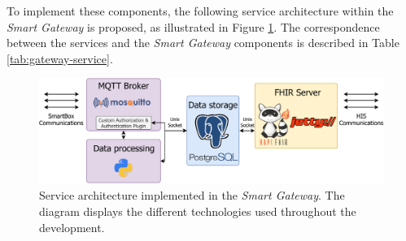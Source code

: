 To implement these components,  the following service architecture within the \textit{Smart Gateway} is proposed, as illustrated in Figure \ref{fig:gateway_serviceoverview}. The correspondence between the services and the \textit{Smart Gateway} components is described in Table \ref{tab:gateway-service}.

\begin{figure}[H]
    \centering
    \includegraphics[width=0.93\linewidth]{images/service overview gateway.pdf}
    \caption[Service architecture implemented in the \textit{Smart Gateway}.]{Service architecture implemented in the \textit{Smart Gateway}. The diagram displays the different technologies used throughout the development.}
    \label{fig:gateway_serviceoverview}
\end{figure}
